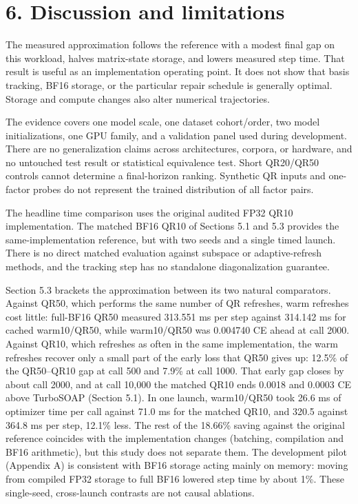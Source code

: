\hypertarget{discussion-and-limitations}{%
\section{6. Discussion and
limitations}\label{discussion-and-limitations}}

The measured approximation follows the reference with a modest final gap
on this workload, halves matrix-state storage, and lowers measured step
time. That result is useful as an implementation operating point. It
does not show that basis tracking, BF16 storage, or the particular repair
schedule is generally optimal. Storage and compute changes also alter
numerical trajectories.

The evidence covers one model scale, one dataset cohort/order, two model
initializations, one GPU family, and a validation panel used during
development. There are no generalization claims across architectures,
corpora, or hardware, and no untouched test result or statistical
equivalence test. Short QR20/QR50 controls cannot determine a
final-horizon ranking. Synthetic QR inputs and one-factor probes do not
represent the trained distribution of all factor pairs.

The headline time comparison uses the original audited FP32 QR10
implementation. The matched BF16 QR10 of Sections 5.1 and 5.3 provides
the same-implementation reference, but with two seeds and a single
timed launch. There is no direct matched evaluation
against subspace or adaptive-refresh methods, and the tracking step has no
standalone diagonalization guarantee.

Section 5.3 brackets the approximation between its two natural
comparators. Against QR50, which performs the same number of QR
refreshes, warm refreshes cost little: full-BF16 QR50 measured 313.551
ms per step against 314.142 ms for cached warm10/QR50, while
warm10/QR50 was 0.004740 CE ahead at call 2000. Against QR10, which
refreshes as often in the same implementation, the warm refreshes
recover only a small part of the early loss that QR50 gives up: 12.5\%
of the QR50--QR10 gap at call 500 and 7.9\% at call 1000. That early
gap closes by about call 2000, and at call 10,000 the matched QR10 ends
0.0018 and 0.0003 CE above TurboSOAP (Section 5.1). In one launch,
warm10/QR50 took 26.6 ms of optimizer time per call against 71.0 ms for
the matched QR10, and 320.5 against 364.8 ms per step, 12.1\% less.
The rest of the 18.66\% saving
against the original reference coincides with the implementation
changes (batching, compilation and BF16 arithmetic), but this study
does not separate them. The development pilot
(Appendix A) is consistent with BF16 storage acting mainly on memory:
moving from compiled FP32 storage to full BF16 lowered step time by
about 1\%. These single-seed, cross-launch contrasts are not causal
ablations.


